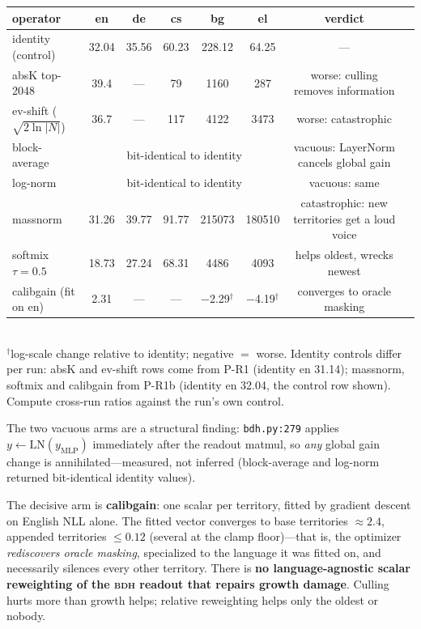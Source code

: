 \documentclass[11pt]{article}
\theoremstyle{definition}\newtheorem{definition}{Definition}
\theoremstyle{remark}\newtheorem{remark}{Remark}
\newcommand{\BDH}{\textsc{bdh}}
\begin{document}
\begin{center}\small
\begin{tabular}{lccccccl}
\toprule
operator & en & de & cs & bg & el & verdict \\
\midrule
identity (control) & 32.04 & 35.56 & 60.23 & 228.12 & 64.25 & --- \\
absK top-2048 & 39.4 & --- & 79 & 1160 & 287 & worse: culling removes information \\
ev-shift ($\sqrt{2\ln|N|}$) & 36.7 & --- & 117 & 4122 & 3473 & worse: catastrophic \\
block-average & \multicolumn{5}{c}{bit-identical to identity} & vacuous: LayerNorm cancels global gain \\
log-norm & \multicolumn{5}{c}{bit-identical to identity} & vacuous: same \\
massnorm & 31.26 & 39.77 & 91.77 & 215073 & 180510 & catastrophic: new territories get a loud voice \\
softmix $\tau{=}0.5$ & 18.73 & 27.24 & 68.31 & 4486 & 4093 & helps oldest, wrecks newest \\
calibgain (fit on en) & 2.31 & --- & --- & $-$2.29$^\dagger$ & $-$4.19$^\dagger$ & converges to oracle masking \\
\bottomrule
\end{tabular}\\
\footnotesize $^\dagger$log-scale change relative to identity; negative $=$ worse. Identity controls differ per run: absK and ev-shift rows come from P-R1 (identity en 31.14); massnorm, softmix and calibgain from P-R1b (identity en 32.04, the control row shown). Compute cross-run ratios against the run's own control.
\end{center}

The two vacuous arms are a structural finding: \texttt{bdh.py:279} applies
$y \leftarrow \mathrm{LN}(y_{\mathrm{MLP}})$ immediately after the readout matmul, so
\emph{any} global gain change is annihilated---measured, not inferred (block-average and
log-norm returned bit-identical identity values).

The decisive arm is \textbf{calibgain}: one scalar per territory, fitted by gradient descent
on English NLL alone. The fitted vector converges to base territories $\approx 2.4$,
appended territories $\le 0.12$ (several at the clamp floor)---that is, the optimizer
\emph{rediscovers oracle masking}, specialized to the language it was fitted on, and
necessarily silences every other territory. There is \textbf{no language-agnostic scalar
reweighting of the \BDH{} readout that repairs growth damage}. Culling hurts more than
growth helps; relative reweighting helps only the oldest or nobody.
\end{document}
